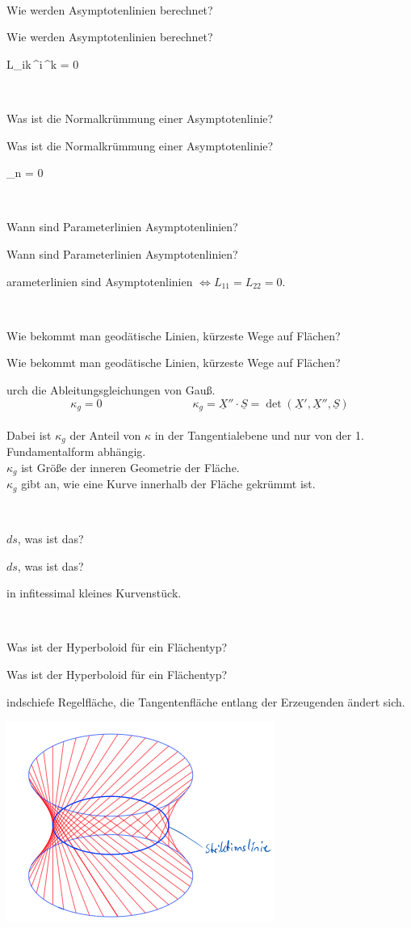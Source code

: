 \documentclass[DIV=1]{scrartcl}
\newcommand{\frage}[3][10]{
    \newpage
    \
    \vspace{#1 em}
    \begin{framed}
        #2
    \end{framed}
    \newpage
    \begin{framed}
        #2
    \end{framed}
    \vspace{2 em}
}
\begin{document}
\frage{Wie werden Asymptotenlinien berechnet?}

\[
    L_{ik}\,^i\,^k = 0 \qquad {}
\]



\frage{Was ist die Normalkrümmung einer Asymptotenlinie?}

\[
    \kappa_n = 0
\]



\frage{Wann sind Parameterlinien Asymptotenlinien?}

Parameterlinien sind Asymptotenlinien $\Leftrightarrow L_{11} = L_{22} = 0$.



\frage{Wie bekommt man geodätische Linien, kürzeste Wege auf Flächen?}
Durch die Ableitungsgleichungen von Gauß.
\[
    \kappa_g = 0
    \qquad\qquad\qquad\qquad
    \kappa_g  = \underline{X}'' \cdot \underline{S} = \det(\underline{X}', \underline{X}'', \underline{S})
\]
\\
Dabei ist $\kappa_g$ der Anteil von $\kappa$ in der Tangentialebene und nur von der 1. Fundamentalform abhängig.\\
$\kappa_g$ ist Größe der inneren Geometrie der Fläche.\\
$\kappa_g$ gibt an, wie eine Kurve innerhalb der Fläche gekrümmt ist.



\frage{$ds$, was ist das?}

Ein infitessimal kleines Kurvenstück.



\frage{Was ist der Hyperboloid für ein Flächentyp?}

Windschiefe Regelfläche, die Tangentenfläche entlang der Erzeugenden ändert sich.
\\
\begin{center}
    \includegraphics[scale=1]{hyperboloid.png}
\end{center}
\end{document}
